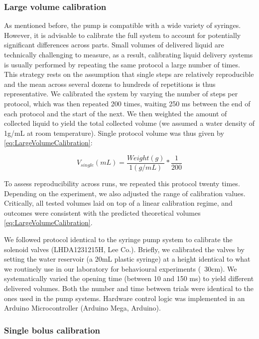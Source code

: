 \subsubsection*{Large volume calibration}
As mentioned before, the pump is compatible with a wide variety of syringes. However, it is advisable to calibrate the full system to account for potentially significant differences across parts. Small volumes of delivered liquid are technically challenging to measure, as a result, calibrating liquid delivery systems is usually performed by repeating the same protocol a large number of times. This strategy rests on the assumption that single steps are relatively reproducible and the mean across several dozens to hundreds of repetitions is thus representative. We calibrated the system by varying the number of steps per protocol, which was then repeated 200 times, waiting 250 ms between the end of each protocol and the start of the next. We then weighted the amount of collected liquid to yield the total collected volume (we assumed a water density of 1g/mL at room temperature). Single protocol volume was thus given by \ref{eq:LargeVolumeCalibration}:

\begin{equation} \label{eq:LargeVolumeCalibration}
    V_{single}(mL) = \frac{Weight (g)}{1 (g/mL)} * \frac{1}{200}
    \end{equation}

To assess reproducibility across runs, we repeated this protocol twenty times. Depending on the experiment, we also adjusted the range of calibration values. Critically, all tested volumes laid on top of a linear calibration regime, and outcomes were consistent with the predicted theoretical volumes \ref{eq:LargeVolumeCalibration}.

We followed protocol identical to the syringe pump system to calibrate the solenoid valves (LHDA1231215H, Lee Co.). Briefly, we calibrated the valves by setting the water reservoir (a 20mL plastic syringe) at a height identical to what we routinely use in our laboratory for behavioural experiments (~30cm). We systematically varied the opening time (between 10 and 150 ms) to yield different delivered volumes. Both the number and time between trials were identical to the ones used in the pump systems. Hardware control logic was implemented in an Arduino Microcontroller (Arduino Mega, Arduino).

\subsubsection*{Single bolus calibration}

